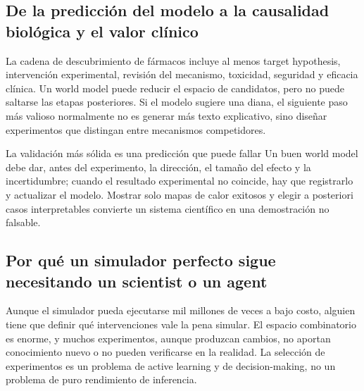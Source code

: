 \documentclass[a4paper]{article}
\begin{document}
\subsection{De la predicción del modelo a la causalidad biológica y el valor clínico}

La cadena de descubrimiento de fármacos incluye al menos target hypothesis, intervención experimental, revisión del mecanismo, toxicidad, seguridad y eficacia clínica. Un world model puede reducir el espacio de candidatos, pero no puede saltarse las etapas posteriores. Si el modelo sugiere una diana, el siguiente paso más valioso normalmente no es generar más texto explicativo, sino diseñar experimentos que distingan entre mecanismos competidores.


\begin{importantbox}{La validación más sólida es una predicción que puede fallar}
Un buen world model debe dar, antes del experimento, la dirección, el tamaño del efecto y la incertidumbre; cuando el resultado experimental no coincide, hay que registrarlo y actualizar el modelo. Mostrar solo mapas de calor exitosos y elegir a posteriori casos interpretables convierte un sistema científico en una demostración no falsable.
\end{importantbox}

\subsection{Por qué un simulador perfecto sigue necesitando un scientist o un agent}

Aunque el simulador pueda ejecutarse mil millones de veces a bajo costo, alguien tiene que definir qué intervenciones vale la pena simular. El espacio combinatorio es enorme, y muchos experimentos, aunque produzcan cambios, no aportan conocimiento nuevo o no pueden verificarse en la realidad. La selección de experimentos es un problema de active learning y de decision-making, no un problema de puro rendimiento de inferencia.

\end{document}
